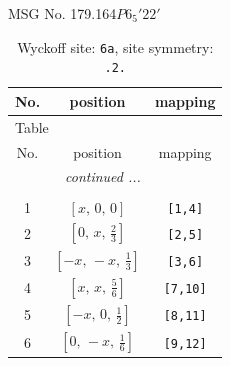 \documentclass[fleqn,8pt]{jsarticle}
\begin{document}
\setcounter{MaxMatrixCols}{32}

\renewcommand{\tablename}{Table~}
\renewcommand{\figurename}{Figure~}
\begin{center}
\LARGE
MSG No. 179.164\quad$P6_{5}'22'$
\end{center}
\renewcommand{\arraystretch}{1.2}
\begin{longtable}{ccc}
\caption{Wyckoff site: {\tt 6a}, site symmetry: {\tt .2.}}
 \\
 \hline \hline
No. & position & mapping \\ \hline \endfirsthead

\multicolumn{2}{l}{\tablename\ \thetable{}} \\
 \hline \hline
No. & position & mapping \\ \hline \endhead

 \hline \hline
\multicolumn{2}{r}{\footnotesize\it continued ...} \\ \endfoot

 \hline \hline
\multicolumn{2}{r}{} \\ \endlastfoot

1 & $\left[ x,\, 0,\, 0 \right]$ & {\tt [1,4]} \\ \hline
2 & $\left[ 0,\, x,\, \frac{2}{3} \right]$ & {\tt [2,5]} \\ \hline
3 & $\left[ - x,\, - x,\, \frac{1}{3} \right]$ & {\tt [3,6]} \\ \hline
4 & $\left[ x,\, x,\, \frac{5}{6} \right]$ & {\tt [7,10]} \\ \hline
5 & $\left[ - x,\, 0,\, \frac{1}{2} \right]$ & {\tt [8,11]} \\ \hline
6 & $\left[ 0,\, - x,\, \frac{1}{6} \right]$ & {\tt [9,12]} \\
\end{longtable}
\renewcommand{\arraystretch}{1.2}
\end{document}
